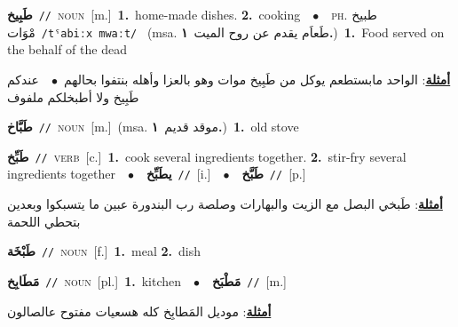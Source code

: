 \documentclass[10pt,a4paper,twoside]{article} %
\begin{document}
\begin{multicols}{2}
{{{{{{\setlength\topsep{0pt}\textbf{\foreignlanguage{arabic}{طَبِيخ}}\ {\color{gray}\texttt{//}\color{black}}\ \textsc{noun}\ [m.]\ \textbf{1.}~home-made dishes.  \textbf{2.}~cooking\ \ $\bullet$\ \ \textsc{ph.} \color{gray} \foreignlanguage{arabic}{طبيخ مْوَات}\color{black}\ {\color{gray}\texttt{/{\sffamily tˤabiːx mwaːt}/}\color{black}}\ \color{gray} (msa. \foreignlanguage{arabic}{طَعاَم يقدم عن روح الميت}~\foreignlanguage{arabic}{\textbf{١.}})\color{black}\ \textbf{1.}~Food served on the behalf of the dead\  \begin{flushright}\color{gray}\foreignlanguage{arabic}{\textbf{\underline{\foreignlanguage{arabic}{أمثلة}}}: الواحد مابستطعم يوكل من طَبِيخ موات وهو بالعزا وأهله بنتفوا بحالهم\ $\bullet$\ \  عندكم طَبِيخ ولا أطبخلكم ملفوف}\end{flushright}\color{black}} \vspace{2mm}

{\setlength\topsep{0pt}\textbf{\foreignlanguage{arabic}{طَبَّاخ}}\ {\color{gray}\texttt{//}\color{black}}\ \textsc{noun}\ [m.]\ \color{gray}(msa. \foreignlanguage{arabic}{موقد قديم}~\foreignlanguage{arabic}{\textbf{١.}})\color{black}\ \textbf{1.}~old stove\ 

{\setlength\topsep{0pt}\textbf{\foreignlanguage{arabic}{طَبِّخ}}\ {\color{gray}\texttt{//}\color{black}}\ \textsc{verb}\ [c.]\ \textbf{1.}~cook several ingredients together.  \textbf{2.}~stir-fry several ingredients together\ \ $\bullet$\ \ \setlength\topsep{0pt}\textbf{\foreignlanguage{arabic}{يطَبِّخ}}\ {\color{gray}\texttt{//}\color{black}}\ [i.]\ \ $\bullet$\ \ \setlength\topsep{0pt}\textbf{\foreignlanguage{arabic}{طَبَّخ}}\ {\color{gray}\texttt{//}\color{black}}\ [p.]\  \begin{flushright}\color{gray}\foreignlanguage{arabic}{\textbf{\underline{\foreignlanguage{arabic}{أمثلة}}}: طَبخي البصل مع الزيت والبهارات وصلصة رب البندورة عبين ما يتسبكوا وبعدين بتحطي اللحمة}\end{flushright}\color{black}} \vspace{2mm}

{\setlength\topsep{0pt}\textbf{\foreignlanguage{arabic}{طَبْخَة}}\ {\color{gray}\texttt{//}\color{black}}\ \textsc{noun}\ [f.]\ \textbf{1.}~meal  \textbf{2.}~dish\ 

{\setlength\topsep{0pt}\textbf{\foreignlanguage{arabic}{مَطَابِخ}}\ {\color{gray}\texttt{//}\color{black}}\ \textsc{noun}\ [pl.]\ \textbf{1.}~kitchen\ \ $\bullet$\ \ \setlength\topsep{0pt}\textbf{\foreignlanguage{arabic}{مَطْبَخ}}\ {\color{gray}\texttt{//}\color{black}}\ [m.]\  \begin{flushright}\color{gray}\foreignlanguage{arabic}{\textbf{\underline{\foreignlanguage{arabic}{أمثلة}}}: موديل المَطابِخ كله هسعيات مفتوح عالصالون}\end{flushright}\color{black}} \vspace{2mm}

}}}}}}}
\end{multicols}
\end{document}
